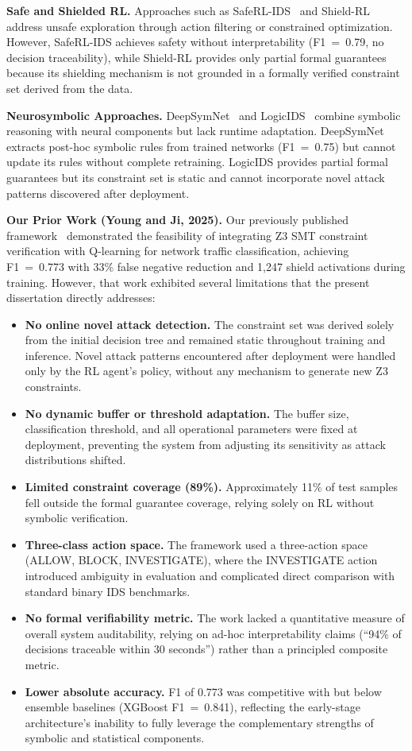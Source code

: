 \documentclass[12pt, letterpaper, oneside]{report}
\begin{document}
\textbf{Safe and Shielded RL.} Approaches such as SafeRL-IDS~\citep{wang2022saferl} and Shield-RL~\citep{kumar2023shield} address unsafe exploration through action filtering or constrained optimization. However, SafeRL-IDS achieves safety without interpretability (F1~=~0.79, no decision traceability), while Shield-RL provides only partial formal guarantees because its shielding mechanism is not grounded in a formally verified constraint set derived from the data.

\textbf{Neurosymbolic Approaches.} DeepSymNet~\citep{zhang2021deepsymnet} and LogicIDS~\citep{li2021logicids} combine symbolic reasoning with neural components but lack runtime adaptation. DeepSymNet extracts post-hoc symbolic rules from trained networks (F1~=~0.75) but cannot update its rules without complete retraining. LogicIDS provides partial formal guarantees but its constraint set is static and cannot incorporate novel attack patterns discovered after deployment.

\textbf{Our Prior Work (Young and Ji, 2025).} Our previously published framework~\citep{young2025adaptive} demonstrated the feasibility of integrating Z3 SMT constraint verification with Q-learning for network traffic classification, achieving F1~=~0.773 with 33\% false negative reduction and 1,247 shield activations during training. However, that work exhibited several limitations that the present dissertation directly addresses:
\begin{itemize}
    \item \textbf{No online novel attack detection.} The constraint set was derived solely from the initial decision tree and remained static throughout training and inference. Novel attack patterns encountered after deployment were handled only by the RL agent's policy, without any mechanism to generate new Z3 constraints.
    \item \textbf{No dynamic buffer or threshold adaptation.} The buffer size, classification threshold, and all operational parameters were fixed at deployment, preventing the system from adjusting its sensitivity as attack distributions shifted.
    \item \textbf{Limited constraint coverage (89\%).} Approximately 11\% of test samples fell outside the formal guarantee coverage, relying solely on RL without symbolic verification.
    \item \textbf{Three-class action space.} The framework used a three-action space (ALLOW, BLOCK, INVESTIGATE), where the INVESTIGATE action introduced ambiguity in evaluation and complicated direct comparison with standard binary IDS benchmarks.
    \item \textbf{No formal verifiability metric.} The work lacked a quantitative measure of overall system auditability, relying on ad-hoc interpretability claims (``94\% of decisions traceable within 30 seconds'') rather than a principled composite metric.
    \item \textbf{Lower absolute accuracy.} F1 of 0.773 was competitive with but below ensemble baselines (XGBoost F1~=~0.841), reflecting the early-stage architecture's inability to fully leverage the complementary strengths of symbolic and statistical components.
\end{itemize}
\end{document}
